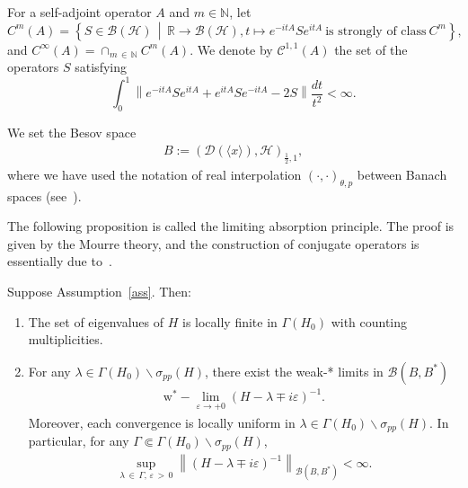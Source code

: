 \documentclass[10pt,a4paper]{amsart}
\newcommand{\e}{\varepsilon}
\renewcommand{\l}{\lambda}
\newcommand{\s}{\sigma}
\newcommand{\R}{\mathbb{R}}
\newcommand{\bbN}{\mathbb{N}}
\newcommand{\HS}{\mathcal{H}}
\newcommand{\BS}{\mathcal{B}}
\newcommand{\CS}{\mathcal{C}}
\newcommand{\DS}{\mathcal{D}}
\newcommand{\jap}[1]{\langle #1 \rangle}
\begin{document}
For a self-adjoint operator $A$ and $m\in\bbN$, let
\[
C^m(A)=\left\{ S\in\BS(\HS) \,\middle|\, \R\to\BS(\HS),t\mapsto e^{-itA}Se^{itA} \ \text{is strongly of class} \ C^m \right\},
\]
and $C^\infty(A)=\cap_{m\,\in\,\bbN}C^m(A)$. We denote by $\CS^{1,1}(A)$ the set of the operators $S$ satisfying
\[
\int_0^1 \left\| e^{-itA} S e^{itA}+e^{itA} S e^{-itA}-2S \right\| \frac{dt}{t^2} < \infty.
\]


We set the Besov space
\begin{align*}
B:=(\DS(\jap{x}),\HS)_{\frac{1}{2},1},
\end{align*}
where we have used the notation of real interpolation $(\cdot,\cdot)_{\theta,p}$ between Banach spaces (see~\cite[Section~2.1]{A-BdM-G}).

The following proposition is called the limiting absorption principle. The proof is given by the Mourre theory, and the construction of conjugate operators is essentially due to~\cite[Lemma~6.2]{P-R}.

\begin{prop}\label{LAP prop}
Suppose Assumption~\ref{ass}. Then:
\begin{enumerate}
\item\label{prop3.1.1} The set of eigenvalues of $H$ is locally finite in $\Gamma(H_0)$ with counting multiplicities.

\item\label{prop3.1.2} For any $\lambda \in \Gamma(H_0)\backslash \s_{pp}(H)$, there exist the weak-* limits in $\BS(B,B^*)$
\begin{align*}
\operatorname{w^*-}\lim_{\e\to+0} (H-\l\mp i\e)^{-1}.
\end{align*}
Moreover, each convergence is locally uniform in $\l\in\Gamma(H_0)\backslash \s_{pp}(H)$. In particular, for any $\Gamma\Subset\Gamma(H_0)\backslash \s_{pp}(H)$,
\begin{align}\label{LAP}
\sup_{\l\,\in\,\Gamma,\,\e\,>\,0} \left\|(H-\l\mp i\e)^{-1}\right\|_{\BS(B,B^*)} < \infty.
\end{align}
\end{enumerate}
\end{prop}
\end{document}
